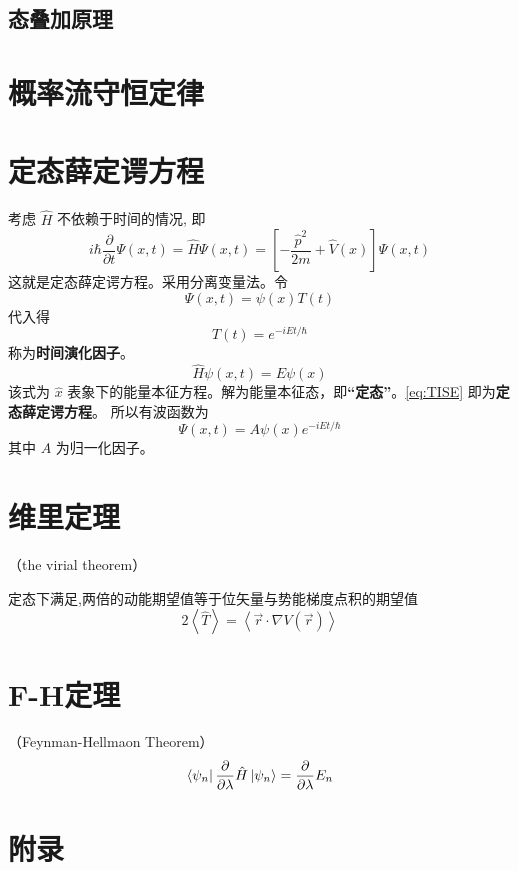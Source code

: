 \documentclass[12pt, a4paper, oneside, UTF8]{ctexbook}
\begin{document}
\subsection{态叠加原理}

\section{概率流守恒定律}

\section{定态薛定谔方程}
考虑 $\hat{H}$ 不依赖于时间的情况, 即
\begin{equation}
    i\hbar\frac{\partial}{\partial t}\Psi(x,t)=\hat{H}\Psi(x,t) = \left[-\frac{\hat{p}^2}{2m}+\hat{V}(x)\right]\Psi(x,t)
\end{equation}
这就是定态薛定谔方程。采用分离变量法。令
\begin{equation}
    \Psi(x,t)=\psi(x)T(t)
\end{equation}
代入得
\begin{equation}
    \boxed{T(t)=e^{-iEt/\hbar}}
\end{equation}
称为\textbf{时间演化因子}。
\begin{equation}
    \boxed{\hat{H}\psi(x,t)=E\psi(x)}\label{eq:TISE}
\end{equation}
该式为 $\hat{x}$ 表象下的能量本征方程。解为能量本征态，即\textbf{“定态”}。\eqref{eq:TISE} 即为\textbf{定态薛定谔方程}。
所以有波函数为
\begin{equation}
    \Psi(x,t)=A\psi(x)e^{-iEt/\hbar}
\end{equation}
其中 $A$ 为归一化因子。

\section{维里定理}
（the virial theorem）

定态下满足,两倍的动能期望值等于位矢量与势能梯度点积的期望值
\begin{equation}
    2\left\langle \hat{T} \right\rangle = \left\langle \vec{r}\cdot \nabla V(\vec{r}) \right\rangle
\end{equation}

\section{F-H定理}
（Feynman-Hellmaon Theorem）
\begin{equation}
    \bra{\psi_n}\frac{\partial }{\partial \lambda}\hat{H}\ket{\psi_n}=\frac{\partial }{\partial \lambda}E_n
\end{equation}
\section{附录}
\ifx\allfiles\undefined
\end{document}

